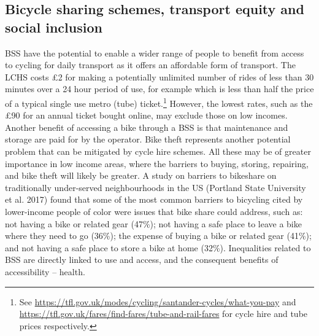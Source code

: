 \documentclass[
]{article}
\begin{document}
\hypertarget{bicycle-sharing-schemes-transport-equity-and-social-inclusion}{%
\subsection{Bicycle sharing schemes, transport equity and social inclusion}\label{bicycle-sharing-schemes-transport-equity-and-social-inclusion}}

BSS have the potential to enable a wider range of people to benefit from access to cycling for daily transport as it offers an affordable form of transport.
The LCHS costs £2 for making a potentially unlimited number of rides of less than 30 minutes over a 24 hour period of use, for example which is less than half the price of a typical single use metro (tube) ticket.\footnote{
  See \url{https://tfl.gov.uk/modes/cycling/santander-cycles/what-you-pay} and \url{https://tfl.gov.uk/fares/find-fares/tube-and-rail-fares} for cycle hire and tube prices respectively.}
However, the lowest rates, such as the £90 for an annual ticket bought online, may exclude those on low incomes.
Another benefit of accessing a bike through a BSS is that maintenance and storage are paid for by the operator. Bike theft represents another potential problem that can be mitigated by cycle hire schemes.
All these may be of greater importance in low income areas, where the barriers to buying, storing, repairing, and bike theft will likely be greater.
A study on barriers to bikeshare on traditionally under-served neighbourhoods in the US (Portland State University et al. 2017) found that some of the most common barriers to bicycling cited by lower-income people of color were issues that bike share could address, such as: not having a bike or related gear (47\%); not having a safe place to leave a bike where they need to go (36\%); the expense of buying a bike or related gear (41\%); and not having a safe place to store a bike at home (32\%).
Inequalities related to BSS are directly linked to use and access, and the consequent benefits of accessibility -- health.
\end{document}
